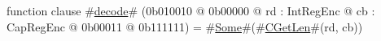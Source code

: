 function clause #\hyperref[sailMIPSzdecode]{decode}# (0b010010 @ 0b00000 @ rd : IntRegEnc @ cb : CapRegEnc @    0b00011 @ 0b111111) = #\hyperref[sailMIPSzSome]{Some}#(#\hyperref[sailMIPSzCGetLen]{CGetLen}#(rd, cb))
